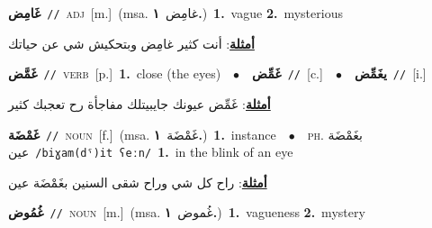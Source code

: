 \documentclass[10pt,a4paper,twoside]{article} %
\begin{document}
\begin{multicols}{2}
{\setlength\topsep{0pt}\textbf{\foreignlanguage{arabic}{غَامِض}}\ {\color{gray}\texttt{//}\color{black}}\ \textsc{adj}\ [m.]\ \color{gray}(msa. \foreignlanguage{arabic}{غامِض}~\foreignlanguage{arabic}{\textbf{١.}})\color{black}\ \textbf{1.}~vague  \textbf{2.}~mysterious\  \begin{flushright}\color{gray}\foreignlanguage{arabic}{\textbf{\underline{\foreignlanguage{arabic}{أمثلة}}}: أنت كثير غامِض وبتحكيش شي عن حياتك}\end{flushright}\color{black}} \vspace{2mm}

{\setlength\topsep{0pt}\textbf{\foreignlanguage{arabic}{غَمَّض}}\ {\color{gray}\texttt{//}\color{black}}\ \textsc{verb}\ [p.]\ \textbf{1.}~close (the eyes)\ \ $\bullet$\ \ \setlength\topsep{0pt}\textbf{\foreignlanguage{arabic}{غَمِّض}}\ {\color{gray}\texttt{//}\color{black}}\ [c.]\ \ $\bullet$\ \ \setlength\topsep{0pt}\textbf{\foreignlanguage{arabic}{يغَمِّض}}\ {\color{gray}\texttt{//}\color{black}}\ [i.]\  \begin{flushright}\color{gray}\foreignlanguage{arabic}{\textbf{\underline{\foreignlanguage{arabic}{أمثلة}}}: غَمِّض عيونك جايبيتلك مفاجأة رح تعجبك كثير}\end{flushright}\color{black}} \vspace{2mm}

{\setlength\topsep{0pt}\textbf{\foreignlanguage{arabic}{غَمْضَة}}\ {\color{gray}\texttt{//}\color{black}}\ \textsc{noun}\ [f.]\ \color{gray}(msa. \foreignlanguage{arabic}{غَمْضَة}~\foreignlanguage{arabic}{\textbf{١.}})\color{black}\ \textbf{1.}~instance\ \ $\bullet$\ \ \textsc{ph.} \color{gray} \foreignlanguage{arabic}{بغَمْضَة عين}\color{black}\ {\color{gray}\texttt{/{\sffamily biɣam(dˤ)it ʕeːn}/}\color{black}}\ \textbf{1.}~in the blink of an eye\  \begin{flushright}\color{gray}\foreignlanguage{arabic}{\textbf{\underline{\foreignlanguage{arabic}{أمثلة}}}: راح كل شي وراح شقى السنين بغَمْضَة عين}\end{flushright}\color{black}} \vspace{2mm}

{\setlength\topsep{0pt}\textbf{\foreignlanguage{arabic}{غُمُوض}}\ {\color{gray}\texttt{//}\color{black}}\ \textsc{noun}\ [m.]\ \color{gray}(msa. \foreignlanguage{arabic}{غُموض}~\foreignlanguage{arabic}{\textbf{١.}})\color{black}\ \textbf{1.}~vagueness  \textbf{2.}~mystery\ } \vspace{2mm}


\end{multicols}
\end{document}
